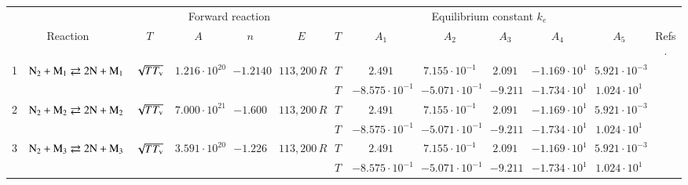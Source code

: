 \documentclass{warpdoc}
\renewcommand{\fontsizetable}{\footnotesize\scalefont{0.9}}
\begin{document}
%




%
\begin{table}[!ht]
\fontsizetable
\begin{center}
\begin{threeparttable}
\setlength\tabcolsep{1.5pt}
\begin{tabular}{ccccccccccccc} 
\toprule
~&~&\multicolumn{4}{c}{Forward reaction} & \multicolumn{6}{c}{Equilibrium constant $k_e$} & ~\\
 \cmidrule(lr){3-6}\cmidrule(lr){7-12}
\multicolumn{2}{c}{Reaction} & $T$ & $A$ & $n$ & $E$ & $T$  & $A_1$ & $A_2$ & $A_3$ &$A_4$& $A_5$ & \multicolumn{1}{c}{Refs.}\\ 
\midrule
1 & $\rm N_2 + M_1 \rightleftarrows 2N+M_1$ &$\sqrt{T T_{\rm v}}$ & $1.216 \cdot 10^{20}$  & $-1.2140$    & $113,200\, R$  
                                          &$T$  & $2.491$  & $7.155 \cdot 10^{-1}$  & $2.091$ & $-1.169 \cdot 10^{1}$ & $5.921 \cdot 10^{-3}$ & \multirow{2}{*}{\cite{jcp:2015:bender,jtht:2018:jaffe,ijhmt:2021:kim}}\\
 & & & & &                                &$T$  & $-8.575 \cdot 10^{-1}$  & $-5.071 \cdot 10^{-1}$  & $-9.211$ & $-1.734 \cdot 10^{1}$ & $1.024 \cdot 10^{1}$ & ~\\                                          
                                          
2 & $\rm N_2 + M_2 \rightleftarrows 2N+M_2$ &$\sqrt{T T_{\rm v}}$  & $7.000 \cdot 10^{21}$ & $-1.600$ & $113,200\, R$ 
                                          &$T$  & $2.491$  & $7.155 \cdot 10^{-1}$  & $2.091$ & $-1.169 \cdot 10^{1}$ & $5.921 \cdot 10^{-3}$ & \multirow{2}{*}{\cite{jtht:1993:park,jtht:2001:park,ijhmt:2021:kim}}\\
 & & & & &                                &$T$  & $-8.575 \cdot 10^{-1}$  & $-5.071 \cdot 10^{-1}$  & $-9.211$ & $-1.734 \cdot 10^{1}$ & $1.024 \cdot 10^{1}$ &~\\                                          
                                          
3 & $\rm N_2 + M_3 \rightleftarrows 2N+M_3$ &$\sqrt{T T_{\rm v}}$  & $3.591 \cdot 10^{20}$ & $-1.226$ & $113,200\, R$ 
                                          &$T$  & $2.491$  & $7.155 \cdot 10^{-1}$  & $2.091$ & $-1.169 \cdot 10^{1}$ & $5.921 \cdot 10^{-3}$ & \multirow{2}{*}{\cite{cp:2013:kim,ijhmt:2021:kim}}\\
 & & & & &                                &$T$  & $-8.575 \cdot 10^{-1}$  & $-5.071 \cdot 10^{-1}$  & $-9.211$ & $-1.734 \cdot 10^{1}$ & $1.024 \cdot 10^{1}$ &~\\                                          
                                          

\end{tabular}
\end{threeparttable}
\end{center}
\end{table}
\end{document}
